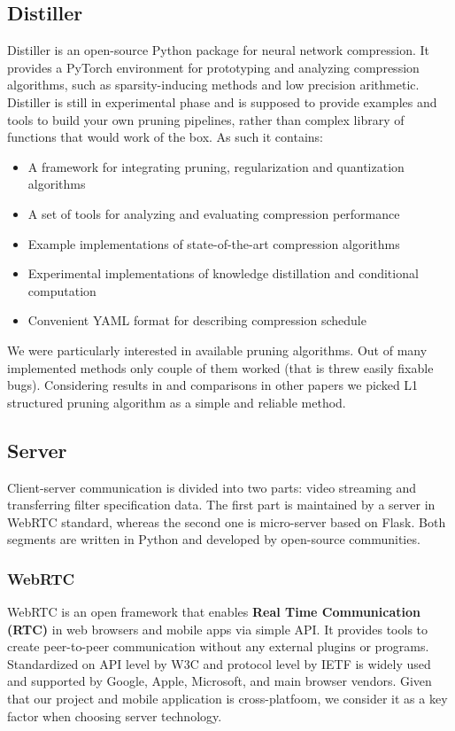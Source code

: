 \documentclass[../Main.tex]{subfiles}
\begin{document}
    \subsection{Distiller}
    Distiller\cite{distiller} is an open-source Python package for neural network compression.
    It provides a PyTorch environment for prototyping and analyzing compression algorithms,
    such as sparsity-inducing methods and low precision arithmetic. Distiller
    is still in experimental phase and is supposed to provide examples and tools
    to build your own pruning pipelines, rather than complex library of functions
    that would work of the box. As such it contains:
    \begin{itemize}
    \item A framework for integrating pruning, regularization and quantization algorithms
    \item A set of tools for analyzing and evaluating compression performance
    \item Example implementations of state-of-the-art compression algorithms
    \item Experimental implementations of knowledge distillation and conditional
          computation
    \item Convenient YAML format for describing compression schedule
    \end{itemize}
    We were particularly interested in available pruning algorithms.
    Out of many implemented methods only couple of them worked (that is threw easily
    fixable bugs). Considering results in \cite{li2016pruning} and comparisons
    in other papers we picked L1 structured pruning algorithm as a simple and reliable 
    method.


\newpage
\subsection{Server}
    Client-server communication is divided into two parts: video streaming and transferring filter specification data. The first part is maintained by a server in WebRTC standard, whereas the second one is micro-server based on Flask. Both segments are written in Python and developed by open-source communities.

    \subsubsection{WebRTC}
    WebRTC is an open framework that enables \textbf{Real Time Communication (RTC)} in web browsers and mobile apps via simple API. It provides tools to create peer-to-peer communication without any external plugins or programs. Standardized on API level by W3C 
    and protocol level by IETF 
    is widely used and supported by Google, Apple, Microsoft, and main browser vendors. Given that our project and mobile application is cross-platfoom, we consider it as a key factor when choosing server technology.
    
\end{document}
